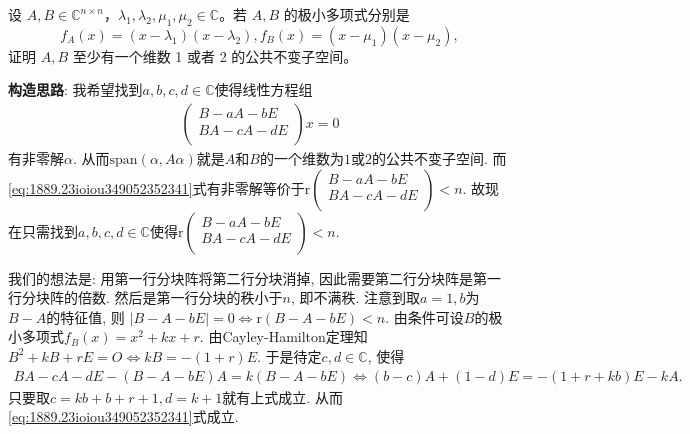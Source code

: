 \documentclass[../../main.tex]{subfiles}
\begin{document}
\begin{proposition}\label{proposition:二次极小多项式由单因式分解必存在公共不变子空间}
设 \( A,B \in \mathbb{C}^{n \times n} \)，\( \lambda_1,\lambda_2,\mu_1,\mu_2 \in \mathbb{C} \)。若 \( A,B \) 的极小多项式分别是
\[ f_A(x) = (x - \lambda_1)(x - \lambda_2), f_B(x) = (x - \mu_1)(x - \mu_2), \]
证明 \( A,B \) 至少有一个维数 1 或者 2 的公共不变子空间。
\end{proposition}
\begin{note}
\textbf{构造思路}: 我希望找到$a,b,c,d\in \mathbb{C}$使得线性方程组
\begin{align}
\left( \begin{array}{c}
B-aA-bE\\
BA-cA-dE\\
\end{array} \right) x=0 \label{eq:1889.23ioiou349052352341}
\end{align}
有非零解$\alpha$. 从而$\mathrm{span}\left( \alpha ,A\alpha \right)$就是$A$和$B$的一个维数为$1$或$2$的公共不变子空间. 而\eqref{eq:1889.23ioiou349052352341}式有非零解等价于$\mathrm{r}\left( \begin{array}{c}
B-aA-bE\\
BA-cA-dE\\
\end{array} \right) <n$. 故现在只需找到$a,b,c,d\in \mathbb{C}$使得$\mathrm{r}\left( \begin{array}{c}
B-aA-bE\\
BA-cA-dE\\
\end{array} \right) <n$.

我们的想法是: 用第一行分块阵将第二行分块消掉, 因此需要第二行分块阵是第一行分块阵的倍数.
然后是第一行分块的秩小于$n$, 即不满秩. 注意到取$a=1,b$为$B-A$的特征值, 则
$| B-A-bE |=0\Longleftrightarrow \mathrm{r}\left( B-A-bE \right) <n.$
由条件可设$B$的极小多项式$f_B\left( x \right) =x^2+kx+r$. 由Cayley-Hamilton定理知
$B^2+kB+rE=O\Longleftrightarrow kB=-\left( 1+r \right) E.$
于是待定$c,d\in \mathbb{C}$, 使得
\begin{align*}
BA-cA-dE-\left( B-A-bE \right) A=k\left( B-A-bE \right) 
\Longleftrightarrow \left( b-c \right) A+\left( 1-d \right) E=-\left( 1+r+kb \right) E-kA.
\end{align*}
只要取$c=kb+b+r+1,d=k+1$就有上式成立. 从而\eqref{eq:1889.23ioiou349052352341}式成立.
\end{note}
\end{document}
